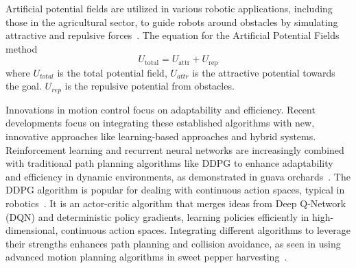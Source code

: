\documentclass[a4paper,fleqn]{cas-dc}
\begin{document}
Artificial potential fields are utilized in various robotic applications, including those in the agricultural sector, to guide robots around obstacles by simulating attractive and repulsive forces~\cite{ling2019dual}. The equation for the Artificial Potential Fields method
\begin{equation}
U_{\text{total}} = U_{\text{attr}} + U_{\text{rep}}
\label{eq:potentialfields}
\end{equation}
where $U_{total}$ is the total potential field, $U_{attr}$ is the attractive potential towards the goal. $U_{rep}$ is the repulsive potential from obstacles.

Innovations in motion control focus on adaptability and efficiency. Recent developments focus on integrating these established algorithms with new, innovative approaches like learning-based approaches and hybrid systems. Reinforcement learning and recurrent neural networks are increasingly combined with traditional path planning algorithms like  DDPG to enhance adaptability and efficiency in dynamic environments, as demonstrated in guava orchards~\cite{lin2021collision}.
The DDPG algorithm is popular for dealing with continuous action spaces, typical in robotics~\cite{lillicrap2015continuous}. It is an actor-critic algorithm that merges ideas from Deep Q-Network (DQN) and deterministic policy gradients, learning policies efficiently in high-dimensional, continuous action spaces.
Integrating different algorithms to leverage their strengths enhances path planning and collision avoidance, as seen in using advanced motion planning algorithms in sweet pepper harvesting~\cite{lehnert2017autonomous}.
\end{document}
